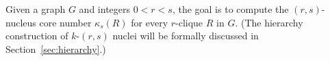 
Given a graph $G$ and integers $0 < r < s$, the goal is to compute the $(r,s)$-nucleus core number $\kappa_s(R)$ for every $r$-clique $R$ in $G$. (The hierarchy construction of $k$-$(r,s)$ nuclei will be formally discussed in Section~\ref{sec:hierarchy}.)


